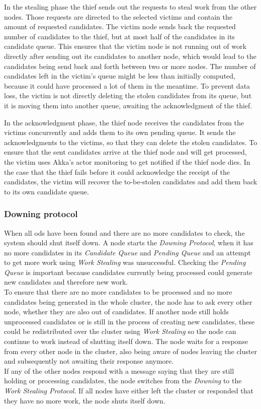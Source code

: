   In the stealing phase the thief sends out the requests to steal work from the other nodes.
  Those requests are directed to the selected victims and contain the amount of requested candidates.
  The victim node sends back the requested number of candidates to the thief, but at most half of the candidates in its candidate queue.
  This ensures that the victim node is not running out of work directly after sending out its candidates to another node, which would lead to the candidates being send back and forth between two or more nodes.
  The number of candidates left in the victim's queue might be less than initially computed, because it could have processed a lot of them in the meantime.
  To prevent data loss, the victim is not directly deleting the stolen candidates from its queue, but it is moving them into another queue, awaiting the acknowledgment of the thief.

  In the acknowledgment phase, the thief node receives the candidates from the victims concurrently and adds them to its own pending queue.
  It sends the acknowledgments to the victims, so that they can delete the stolen candidates.
  To ensure that the sent candidates arrive at the thief node and will get processed, the victim uses Akka's actor monitoring to get notified if the thief node dies.
  In the case that the thief fails before it could acknowledge the receipt of the candidates, the victim will recover the to-be-stolen candidates and add them back to its own candidate queue.

\subsubsection{Downing protocol}\label{protocol:downing}
  When all \glspl{od} have been found and there are no more candidates to check, the system should shut itself down.
  A node starts the \emph{Downing Protocol}, when it has no more candidates in its \emph{Candidate Queue} and \emph{Pending Queue} and an attempt to get more work using \emph{Work Stealing} was unsuccessful.
  Checking the \emph{Pending Queue} is important because candidates currently being processed could generate new candidates and therefore new work.\\
  To ensure that there are no more candidates to be processed and no more candidates being generated in the whole cluster, the node has to ask every other node, whether they are also out of candidates.
  If another node still holds unprocessed candidates or is still in the process of creating new candidates, these could be redistributed over the cluster using \emph{Work Stealing} so the node can continue to work instead of shutting itself down.
  The node waits for a response from every other node in the cluster, also being aware of nodes leaving the cluster and subsequently not awaiting their response anymore.\\
  If any of the other nodes respond with a message saying that they are still holding or processing candidates, the node switches from the \emph{Downing} to the \emph{Work Stealing Protocol}.
  If all nodes have either left the cluster or responded that they have no more work, the node shuts itself down.

